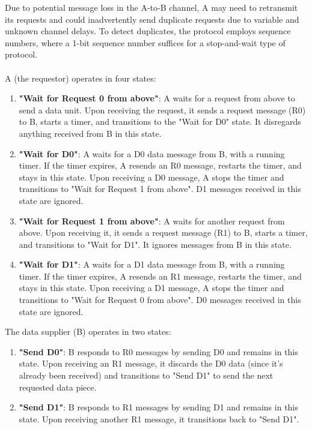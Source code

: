 Due to potential message loss in the A-to-B channel, A may need to retransmit its requests and could inadvertently send duplicate requests due to variable and unknown channel delays. To detect duplicates, the protocol employs sequence numbers, where a 1-bit sequence number suffices for a stop-and-wait type of protocol. \\
\\
A (the requestor) operates in four states:
\begin{enumerate}
    \item \textbf{"Wait for Request 0 from above"}: A waits for a request from above to send a data unit. Upon receiving the request, it sends a request message (R0) to B, starts a timer, and transitions to the "Wait for D0" state. It disregards anything received from B in this state.
    \item \textbf{"Wait for D0"}: A waits for a D0 data message from B, with a running timer. If the timer expires, A resends an R0 message, restarts the timer, and stays in this state. Upon receiving a D0 message, A stops the timer and transitions to "Wait for Request 1 from above". D1 messages received in this state are ignored.
    \item \textbf{"Wait for Request 1 from above"}: A waits for another request from above. Upon receiving it, it sends a request message (R1) to B, starts a timer, and transitions to "Wait for D1". It ignores messages from B in this state.
    \item \textbf{"Wait for D1"}: A waits for a D1 data message from B, with a running timer. If the timer expires, A resends an R1 message, restarts the timer, and stays in this state. Upon receiving a D1 message, A stops the timer and transitions to "Wait for Request 0 from above". D0 messages received in this state are ignored.
\end{enumerate}

The data supplier (B) operates in two states:
\begin{enumerate}
    \item \textbf{"Send D0"}: B responds to R0 messages by sending D0 and remains in this state. Upon receiving an R1 message, it discards the D0 data (since it's already been received) and transitions to "Send D1" to send the next requested data piece.
    \item \textbf{"Send D1"}: B responds to R1 messages by sending D1 and remains in this state. Upon receiving another R1 message, it transitions back to "Send D1".
\end{enumerate}



